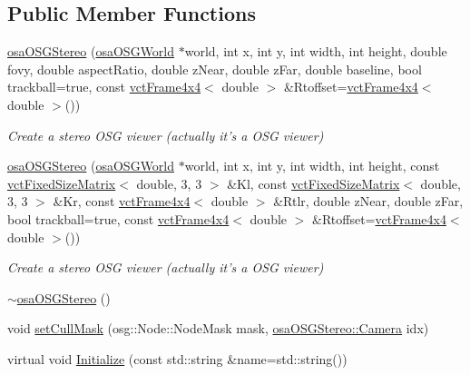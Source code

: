 \subsection*{Public Member Functions}
\begin{DoxyCompactItemize}
\item 
\hyperlink{classosa_o_s_g_stereo_a679f7f90565f4666470a5c5204519139}{osa\-O\-S\-G\-Stereo} (\hyperlink{classosa_o_s_g_world}{osa\-O\-S\-G\-World} $\ast$world, int x, int y, int width, int height, double fovy, double aspect\-Ratio, double z\-Near, double z\-Far, double baseline, bool trackball=true, const \hyperlink{classvct_frame4x4}{vct\-Frame4x4}$<$ double $>$ \&Rtoffset=\hyperlink{classvct_frame4x4}{vct\-Frame4x4}$<$ double $>$())
\begin{DoxyCompactList}\small\item\em Create a stereo O\-S\-G viewer (actually it's a O\-S\-G viewer) \end{DoxyCompactList}\item 
\hyperlink{classosa_o_s_g_stereo_a487965aaa17602706dedfd33feb07951}{osa\-O\-S\-G\-Stereo} (\hyperlink{classosa_o_s_g_world}{osa\-O\-S\-G\-World} $\ast$world, int x, int y, int width, int height, const \hyperlink{classvct_fixed_size_matrix}{vct\-Fixed\-Size\-Matrix}$<$ double, 3, 3 $>$ \&Kl, const \hyperlink{classvct_fixed_size_matrix}{vct\-Fixed\-Size\-Matrix}$<$ double, 3, 3 $>$ \&Kr, const \hyperlink{classvct_frame4x4}{vct\-Frame4x4}$<$ double $>$ \&Rtlr, double z\-Near, double z\-Far, bool trackball=true, const \hyperlink{classvct_frame4x4}{vct\-Frame4x4}$<$ double $>$ \&Rtoffset=\hyperlink{classvct_frame4x4}{vct\-Frame4x4}$<$ double $>$())
\begin{DoxyCompactList}\small\item\em Create a stereo O\-S\-G viewer (actually it's a O\-S\-G viewer) \end{DoxyCompactList}\item 
\hyperlink{classosa_o_s_g_stereo_a2ecf5436991a23c05bb8b6e369a9639a}{$\sim$osa\-O\-S\-G\-Stereo} ()
\item 
void \hyperlink{classosa_o_s_g_stereo_ab293b6407e47ea93b55e0c3768f07917}{set\-Cull\-Mask} (osg\-::\-Node\-::\-Node\-Mask mask, \hyperlink{classosa_o_s_g_stereo_a6f3072fa8cc1d46fcedff6b2d497f396}{osa\-O\-S\-G\-Stereo\-::\-Camera} idx)
\item 
virtual void \hyperlink{classosa_o_s_g_stereo_af0dd91d449cc12fc125326378e4214f2}{Initialize} (const std\-::string \&name=std\-::string())
\end{DoxyCompactItemize}
